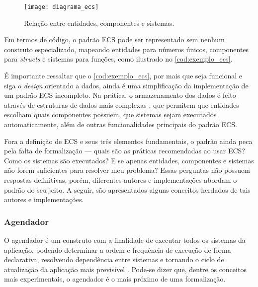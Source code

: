 \begin{figure}[H]
	\centering
	\texttt{[image: diagrama\_ecs]}
	\caption{Relação entre entidades, componentes e sistemas.}
	\label{fig:diagrama_ecs}
\end{figure}

Em termos de código, o padrão ECS pode ser representado sem nenhum construto especializado, mapeando entidades para números únicos, componentes para \textit{structs} e sistemas para funções, como ilustrado no \autoref{cod:exemplo_ecs}.

\codigoRust

\vspace{-1em}

É importante ressaltar que o \autoref{cod:exemplo_ecs}, por mais que seja funcional e siga o \textit{design} orientado a dados, ainda é uma simplificação da implementação de um padrão ECS incompleto. Na prática, o armazenamento dos dados é feito através de estruturas de dados mais complexas \cite{ecsstorageinpics}, que permitem que entidades escolham quais componentes possuem, que sistemas sejam executados automaticamente, além de outras funcionalidades principais do padrão ECS.

Fora a definição de ECS e seus três elementos fundamentais, o padrão ainda peca pela falta de formalização — quais são as práticas recomendadas ao usar ECS? Como os sistemas são executados? E se apenas entidades, componentes e sistemas não forem suficientes para resolver meu problema? Essas perguntas não possuem respostas definitivas, porém, diferentes autores e implementações abordam o padrão do seu jeito. A seguir, são apresentados alguns conceitos herdados de tais autores e implementações.

\subsubsection{Agendador}

O agendador é um construto com a finalidade de executar todos os sistemas da aplicação, podendo determinar a ordem e frequência de execução de forma declarativa, resolvendo dependência entre sistemas e tornando o ciclo de atualização da aplicação mais previsível \cite{bevy}. Pode-se dizer que, dentre os conceitos mais experimentais, o agendador é o mais próximo de uma formalização.

